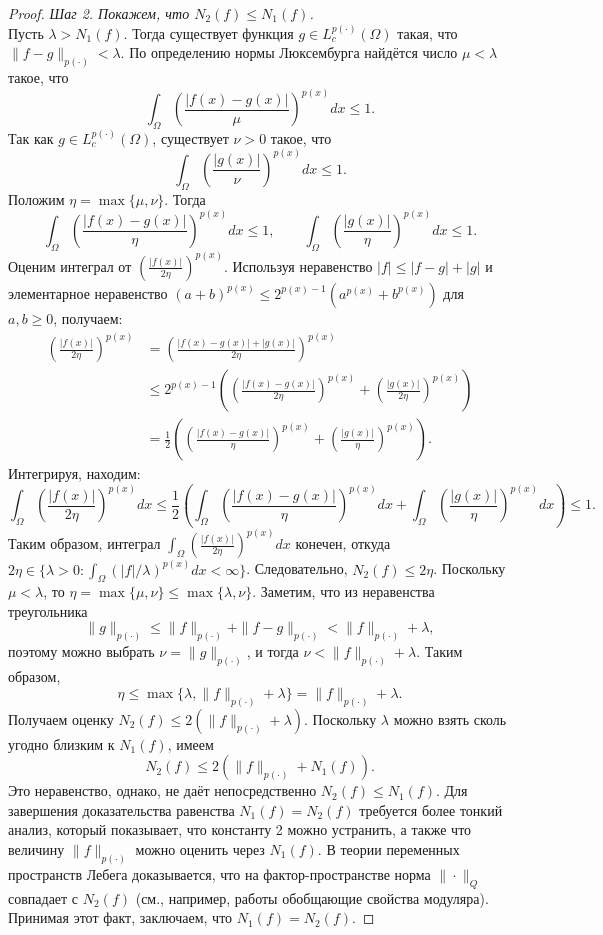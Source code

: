 \documentclass[../NDCNNAI_main.tex]{subfiles}
\begin{document}
\begin{proof}
\textit{Шаг 2. Покажем, что \( N_2(f) \leq N_1(f) \).} \\
Пусть \( \lambda > N_1(f) \). Тогда существует функция \( g \in L_c^{p(\cdot)}(\Omega) \) такая, что \( \|f - g\|_{p(\cdot)} < \lambda \). По определению нормы Люксембурга найдётся число \( \mu < \lambda \) такое, что
\[
\int_\Omega \left( \frac{|f(x) - g(x)|}{\mu} \right)^{p(x)} dx \leq 1.
\]
Так как \( g \in L_c^{p(\cdot)}(\Omega) \), существует \( \nu > 0 \) такое, что
\[
\int_\Omega \left( \frac{|g(x)|}{\nu} \right)^{p(x)} dx \leq 1.
\]
Положим \( \eta = \max\{\mu, \nu\} \). Тогда
\[
\int_\Omega \left( \frac{|f(x) - g(x)|}{\eta} \right)^{p(x)} dx \leq 1, \qquad
\int_\Omega \left( \frac{|g(x)|}{\eta} \right)^{p(x)} dx \leq 1.
\]
Оценим интеграл от \( \left( \frac{|f(x)|}{2\eta} \right)^{p(x)} \). Используя неравенство \( |f| \leq |f-g| + |g| \) и элементарное неравенство \( (a+b)^{p(x)} \leq 2^{p(x)-1}(a^{p(x)} + b^{p(x)}) \) для \( a,b \geq 0 \), получаем:
\[
\begin{aligned}
\left( \frac{|f(x)|}{2\eta} \right)^{p(x)} 
&= \left( \frac{|f(x)-g(x)| + |g(x)|}{2\eta} \right)^{p(x)} \\
&\leq 2^{p(x)-1} \left( \left( \frac{|f(x)-g(x)|}{2\eta} \right)^{p(x)} + \left( \frac{|g(x)|}{2\eta} \right)^{p(x)} \right) \\
&= \frac{1}{2} \left( \left( \frac{|f(x)-g(x)|}{\eta} \right)^{p(x)} + \left( \frac{|g(x)|}{\eta} \right)^{p(x)} \right).
\end{aligned}
\]
Интегрируя, находим:
\[
\int_\Omega \left( \frac{|f(x)|}{2\eta} \right)^{p(x)} dx 
\leq \frac{1}{2} \left( \int_\Omega \left( \frac{|f(x)-g(x)|}{\eta} \right)^{p(x)} dx + \int_\Omega \left( \frac{|g(x)|}{\eta} \right)^{p(x)} dx \right) \leq 1.
\]
Таким образом, интеграл \( \int_\Omega \left( \frac{|f(x)|}{2\eta} \right)^{p(x)} dx \) конечен, откуда \( 2\eta \in \{\lambda > 0 \colon \int_\Omega (|f|/\lambda)^{p(x)} dx < \infty\} \). Следовательно, \( N_2(f) \leq 2\eta \). Поскольку \( \mu < \lambda \), то \( \eta = \max\{\mu, \nu\} \leq \max\{\lambda, \nu\} \). Заметим, что из неравенства треугольника
\[
\|g\|_{p(\cdot)} \leq \|f\|_{p(\cdot)} + \|f - g\|_{p(\cdot)} < \|f\|_{p(\cdot)} + \lambda,
\]
поэтому можно выбрать \( \nu = \|g\|_{p(\cdot)} \), и тогда \( \nu < \|f\|_{p(\cdot)} + \lambda \). Таким образом,
\[
\eta \leq \max\{\lambda, \|f\|_{p(\cdot)} + \lambda\} = \|f\|_{p(\cdot)} + \lambda.
\]
Получаем оценку \( N_2(f) \leq 2(\|f\|_{p(\cdot)} + \lambda) \). Поскольку \( \lambda \) можно взять сколь угодно близким к \( N_1(f) \), имеем
\[
N_2(f) \leq 2(\|f\|_{p(\cdot)} + N_1(f)).
\]
Это неравенство, однако, не даёт непосредственно \( N_2(f) \leq N_1(f) \). Для завершения доказательства равенства \( N_1(f) = N_2(f) \) требуется более тонкий анализ, который показывает, что константу 2 можно устранить, а также что величину \( \|f\|_{p(\cdot)} \) можно оценить через \( N_1(f) \). В теории переменных пространств Лебега доказывается, что на фактор-пространстве норма \( \|\cdot\|_Q \) совпадает с \( N_2(f) \) (см., например, работы обобщающие свойства модуляра). Принимая этот факт, заключаем, что \( N_1(f) = N_2(f) \).


\end{proof}
\end{document}
